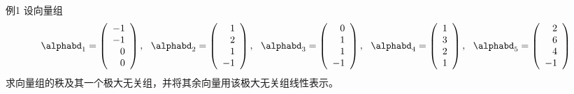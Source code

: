 \begin{li}{例1}
  设向量组
  $$
  \alphabd_1=\left(
    \begin{array}{r}
      -1\\-1\\0\\0
    \end{array}
  \right),~~ \alphabd_2=\left(
    \begin{array}{r}
      1\\2\\1\\-1
    \end{array}
  \right),~~ \alphabd_3=\left(
    \begin{array}{r}
      0\\1\\1\\-1
    \end{array}
  \right),~~ \alphabd_4=\left(
    \begin{array}{r}
      1\\3\\2\\1
    \end{array}
  \right),~~ \alphabd_5=\left(
    \begin{array}{r}
      2\\6\\4\\-1
    \end{array}
  \right)
  $$
  求向量组的秩及其一个极大无关组，并将其余向量用该极大无关组线性表示。
\end{li}
